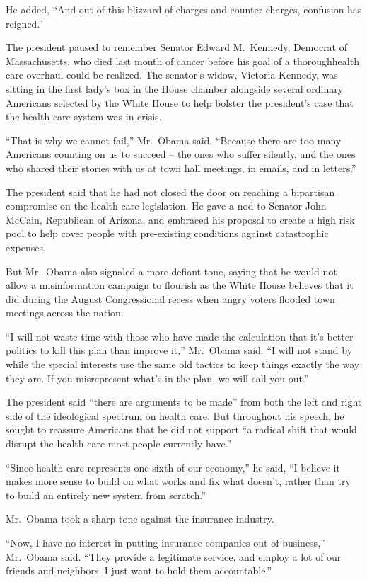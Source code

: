 ﻿\documentclass[12pt]{article}
\begin{document}
He added, ``And out of this blizzard of charges and counter-charges, confusion has reigned.''

The president paused to remember Senator Edward M.~Kennedy, Democrat of Massachusetts, who died last
month of cancer before his goal of a thoroughhealth care overhaul could be realized. The senator's
widow, Victoria Kennedy, was sitting in the first lady's box in the House chamber alongside several
ordinary Americans selected by the White House to help bolster the president's case that the health
care system was in crisis.

``That is why we cannot fail,'' Mr.~Obama said. ``Because there are too many Americans counting on
us to succeed – the ones who suffer silently, and the ones who shared their stories with us at town
hall meetings, in emails, and in letters.''

The president said that he had not closed the door on reaching a bipartisan compromise on the health
care legislation. He gave a nod to Senator John McCain, Republican of Arizona, and embraced his
proposal to create a high risk pool to help cover people with pre-existing conditions against
catastrophic expenses.

But Mr.~Obama also signaled a more defiant tone, saying that he would not allow a misinformation
campaign to flourish as the White House believes that it did during the August Congressional recess
when angry voters flooded town meetings across the nation.

``I will not waste time with those who have made the calculation that it's better politics to kill
this plan than improve it,'' Mr.~Obama said. ``I will not stand by while the special interests use
the same old tactics to keep things exactly the way they are. If you misrepresent what's in the
plan, we will call you out.''

The president said ``there are arguments to be made'' from both the left and right side of the
ideological spectrum on health care. But throughout his speech, he sought to reassure Americans that
he did not support ``a radical shift that would disrupt the health care most people currently
have.''

``Since health care represents one-sixth of our economy,'' he said, ``I believe it makes more sense
to build on what works and fix what doesn't, rather than try to build an entirely new system from
scratch.''

Mr.~Obama took a sharp tone against the insurance industry.

``Now, I have no interest in putting insurance companies out of business,'' Mr.~Obama said. ``They
provide a legitimate service, and employ a lot of our friends and neighbors. I just want to hold
them accountable.''
\end{document}
